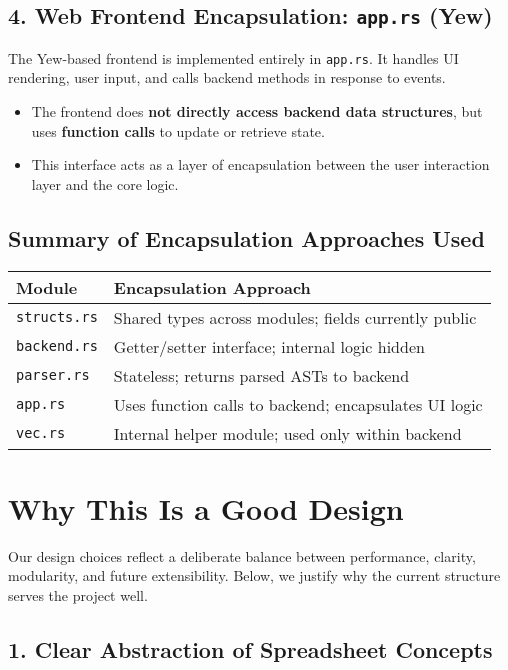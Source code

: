 \documentclass{article}
\begin{document}
\subsection*{4. Web Frontend Encapsulation: \texttt{app.rs} (Yew)}
The Yew-based frontend is implemented entirely in \texttt{app.rs}. It handles UI rendering, user input, and calls backend methods in response to events.
\begin{itemize}
    \item The frontend does \textbf{not directly access backend data structures}, but uses \textbf{function calls} to update or retrieve state.
    \item This interface acts as a layer of encapsulation between the user interaction layer and the core logic.
\end{itemize}

\subsection*{Summary of Encapsulation Approaches Used}

\begin{tabular}{|l|l|}
\hline
\textbf{Module} & \textbf{Encapsulation Approach} \\
\hline
\texttt{structs.rs} & Shared types across modules; fields currently public \\
\texttt{backend.rs} & Getter/setter interface; internal logic hidden \\
\texttt{parser.rs} & Stateless; returns parsed ASTs to backend \\
\texttt{app.rs} & Uses function calls to backend; encapsulates UI logic \\
\texttt{vec.rs} & Internal helper module; used only within backend \\
\hline
\end{tabular}

\section*{Why This Is a Good Design}

Our design choices reflect a deliberate balance between performance, clarity, modularity, and future extensibility. Below, we justify why the current structure serves the project well.

\subsection*{1. Clear Abstraction of Spreadsheet Concepts}
\end{document}
